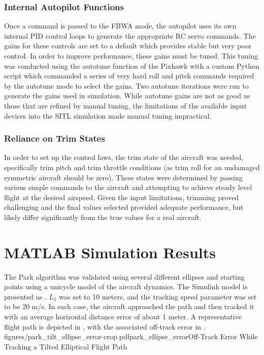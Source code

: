 \documentclass{aiaa}
\begin{document}
\subsubsection{Internal Autopilot Functions}
Once a command is passed to the FBWA mode, the autopilot uses its own internal PID control loops to generate the appropriate RC servo commands. The gains for these controls are set to a default which provides stable but very poor control. In order to improve performance, these gains must be tuned. This tuning was conducted using the autotune function of the Pixhawk with a custom Python script which commanded a series of very hard roll and pitch commands required by the autotune mode to select the gains. Two autotune iterations were run to generate the gains used in simulation. While autotune gains are not as good as those that are refined by manual tuning, the limitations of the available input devices into the SITL simulation made manual tuning impractical.

\subsubsection{Reliance on Trim States}
In order to set up the control laws, the trim state of the aircraft was needed, specifically trim pitch and trim throttle conditions (as trim roll for an undamaged symmetric aircraft should be zero). These states were determined by passing various simple commands to the aircraft and attempting to achieve steady level flight at the desired airspeed. Given the input limitations, trimming proved challenging and the final values selected provided adequate performance, but likely differ significantly from the true values for a real aircraft.

\section{MATLAB Simulation Results}
The Park algorithm was validated using several different ellipses and starting points using a unicycle model of the aircraft dynamics. The Simulink model is presented as . $L_1$ was set to 10 meters, and the tracking speed parameter was set to be 20 m/s.  In each case, the aircraft approached the path and then tracked it with an average horizontal distance error of about 1 meter. A representative flight path is depicted in , with the associated off-track error in .
{figures/park_tilt_ellipse_error-crop.pdf}{park_ellipse_error}{Off-Track Error While Tracking a Tilted Elliptical Flight Path}
\end{document}
